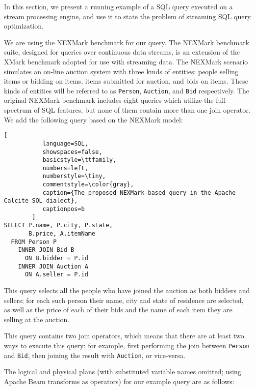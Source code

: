 \label {sec:fs-optimization-problem-statement}

In this section, we present a running example of a SQL query executed on a stream processing engine, and use it to state the problem of streaming SQL query optimization.

We are using the NEXMark benchmark \cite{tucker2008nexmark} for our query. The NEXMark benchmark suite, designed for queries over continuous data streams, is an extension of the XMark benchmark \cite{schmidt2002xmark} adopted for use with streaming data. The NEXMark scenario simulates an on-line auction system with three kinds of entities: people selling items or bidding on items, items submitted for auction, and bids on items. These kinds of entities will be referred to as \texttt{Person}, \texttt{Auction}, and \texttt{Bid} respectively. The original NEXMark benchmark includes eight queries which utilize the full spectrum of SQL features, but none of them contain more than one join operator. We add the following query based on the NEXMark model: \\

\begin{lstlisting}[
           language=SQL,
           showspaces=false,
           basicstyle=\ttfamily,
           numbers=left,
           numberstyle=\tiny,
           commentstyle=\color{gray},
           caption={The proposed NEXMark-based query in the Apache Calcite SQL dialect}, 
           captionpos=b
        ]
SELECT P.name, P.city, P.state, 
       B.price, A.itemName 
  FROM Person P 
    INNER JOIN Bid B 
      ON B.bidder = P.id 
    INNER JOIN Auction A 
      ON A.seller = P.id
\end{lstlisting}

This query selects all the people who have joined the auction as both bidders and sellers; for each such person their name, city and state of residence are selected, as well as the price of each of their bids and the name of each item they are selling at the auction. 

This query contains two join operators, which means that there are at least two ways to execute this query: for example, first performing the join between \texttt{Person} and \texttt{Bid}, then joining the result with \texttt{Auction}, or vice-versa. 

The logical and physical plans (with substituted variable names omitted; using Apache Beam transforms as operators) for our example query are as follows: \\

